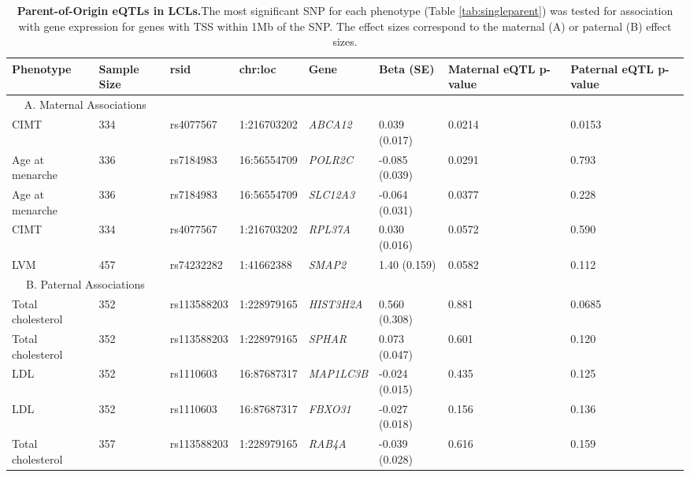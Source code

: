 \begin{table}
\centering
\begin{adjustbox}{width={\textwidth}}
\begin{tabular}{@{}p{3cm}|p{2cm}p{2cm}p{2cm}p{2.5cm}p{2cm}p{2cm}p{2cm}@{}}
\toprule Phenotype & Sample Size & rsid & chr:loc & Gene & Beta (SE) & Maternal eQTL p-value & Paternal eQTL p-value  \\ \midrule
 \multicolumn{2}{c}{A. Maternal Associations} &&&&&& \\ \hline

CIMT & 334 & rs4077567 & 1:216703202 & \emph{ABCA12} & 0.039 (0.017) & 0.0214 & 0.0153 \\ \hline
Age at menarche & 336 & rs7184983 & 16:56554709 & \emph{POLR2C} & -0.085 (0.039) & 0.0291 & 0.793 \\ \hline
Age at menarche & 336 & rs7184983 & 16:56554709 & \emph{SLC12A3} & -0.064 (0.031) & 0.0377 & 	0.228 \\ \hline
CIMT & 334 & rs4077567 & 1:216703202 & \emph{RPL37A} & 0.030 (0.016) & 0.0572 & 0.590 \\ \hline
LVM & 457 & rs74232282 & 1:41662388 & \emph{SMAP2} & 1.40 (0.159) & 0.0582	& 0.112 \\ \hline
 \multicolumn{2}{c}{B. Paternal Associations} &&&&&&  \\ \hline
Total cholesterol & 352 & rs113588203 & 1:228979165 & \emph{HIST3H2A} & 	0.560 (0.308) & 	0.881 & 	0.0685 \\ \hline
Total cholesterol & 352 & rs113588203 & 1:228979165 & \emph{SPHAR} & 	0.073 (0.047) & 	0.601 & 	0.120 \\ \hline
LDL & 352 & rs1110603 & 16:87687317 & \emph{MAP1LC3B} & -0.024 (0.015) & 	0.435 & 	0.125 \\ \hline
LDL & 352 & rs1110603 & 16:87687317 & \emph{FBXO31} & -0.027 (0.018)	 & 0.156 & 	0.136 \\ \hline
Total cholesterol & 357 & rs113588203 & 1:228979165 & \emph{RAB4A} & 	-0.039 (0.028) & 	0.616 & 	0.159\\ \bottomrule
\end{tabular}
\end{adjustbox}
\caption[Parent-of-Origin eQTLs in LCLs. ]{\textbf{Parent-of-Origin eQTLs in LCLs.}The most significant SNP for each phenotype (Table \ref{tab:singleparent}) was tested for association with gene expression for genes with TSS within 1Mb of the SNP. The effect sizes correspond to the maternal (A) or paternal (B) effect sizes.}
\label{tab:pogexp}
\end{table}



